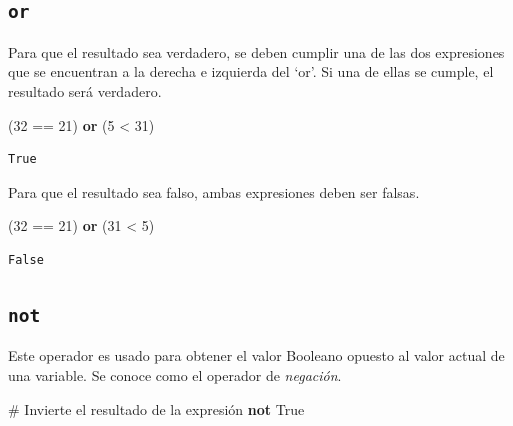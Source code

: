 \documentclass[
  spanish,
  letterpaper,
]{scrbook}
\newenvironment{Shaded}{\begin{snugshade}}{\end{snugshade}}
\newcommand{\CommentTok}[1]{\textcolor[rgb]{0.37,0.37,0.37}{#1}}
\newcommand{\DecValTok}[1]{\textcolor[rgb]{0.68,0.00,0.00}{#1}}
\newcommand{\KeywordTok}[1]{\textcolor[rgb]{0.00,0.23,0.31}{\textbf{#1}}}
\newcommand{\NormalTok}[1]{\textcolor[rgb]{0.00,0.23,0.31}{#1}}
\newcommand{\OperatorTok}[1]{\textcolor[rgb]{0.37,0.37,0.37}{#1}}
\newcommand{\VariableTok}[1]{\textcolor[rgb]{0.07,0.07,0.07}{#1}}
\theoremstyle{definition}
\theoremstyle{remark}
\begin{document}
\subsection{\texorpdfstring{\texttt{or}}{or}}\label{or}

Para que el resultado sea verdadero, se deben cumplir una de las dos
expresiones que se encuentran a la derecha e izquierda del `or'. Si una
de ellas se cumple, el resultado será verdadero.

\begin{Shaded}
\begin{Highlighting}[]
\NormalTok{(}\DecValTok{32} \OperatorTok{==} \DecValTok{21}\NormalTok{) }\KeywordTok{or}\NormalTok{ (}\DecValTok{5} \OperatorTok{\textless{}} \DecValTok{31}\NormalTok{)}
\end{Highlighting}
\end{Shaded}

\begin{verbatim}
True
\end{verbatim}

Para que el resultado sea falso, ambas expresiones deben ser falsas.

\begin{Shaded}
\begin{Highlighting}[]
\NormalTok{(}\DecValTok{32} \OperatorTok{==} \DecValTok{21}\NormalTok{) }\KeywordTok{or}\NormalTok{ (}\DecValTok{31} \OperatorTok{\textless{}} \DecValTok{5}\NormalTok{) }
\end{Highlighting}
\end{Shaded}

\begin{verbatim}
False
\end{verbatim}

\subsection{\texorpdfstring{\texttt{not}}{not}}\label{not}

Este operador es usado para obtener el valor Booleano opuesto al valor
actual de una variable. Se conoce como el operador de \emph{negación}.

\begin{Shaded}
\begin{Highlighting}[]
\CommentTok{\# Invierte el resultado de la expresión}
\KeywordTok{not} \VariableTok{True}
\end{Highlighting}
\end{Shaded}
\end{document}
